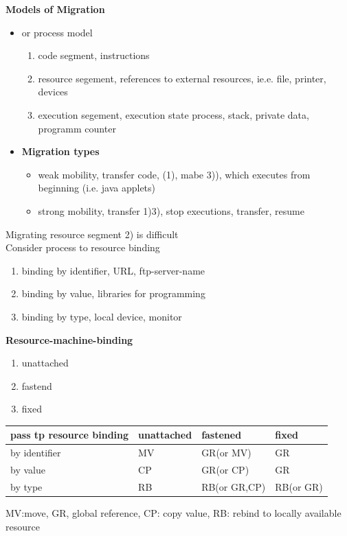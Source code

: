 \documentclass[ngerman,a4paper]{report}
\begin{document}
\textbf{Models of Migration}
\begin{itemize}
	\item or process model\begin{enumerate}
		\item code segment, instructions
		\item resource segement, references to external resources, ie.e. file, printer, devices
		\item execution segement, execution state process, stack, private data, programm counter

	\end{enumerate}
	\item \textbf{Migration types}\begin{itemize}
		\item weak mobility, transfer code, (1), mabe 3)), which executes from beginning (i.e. java applets)
		\item strong mobility, transfer 1)3), stop executions, transfer, resume
	\end{itemize}
\end{itemize}


Migrating resource segment 2) is difficult\\
Consider process to resource binding\\
\begin{enumerate}
	\item binding by identifier, URL, ftp-server-name
	\item binding by value, libraries for programming
	\item binding by type, local device, monitor
\end{enumerate}

\textbf{Resource-machine-binding}
\begin{enumerate}
	\item unattached
	\item fastend
	\item fixed
\end{enumerate}

\begin{tabular}{l| l| l| l}
pass tp resource binding&unattached&fastened&fixed\\
\hline
by identifier& MV&GR(or MV)& GR\\
\hline
by value& CP& GR(or CP)& GR\\
\hline
by type& RB&RB(or GR,CP)&RB(or GR)\\
\end{tabular}
MV:move, GR, global reference, CP: copy value, RB: rebind to locally available resource
\end{document}
